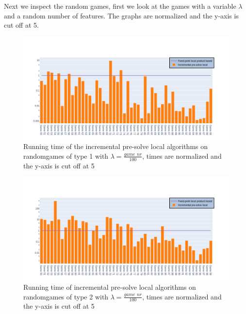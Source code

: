 Next we inspect the random games, first we look at the games with a variable $\lambda$ and a random number of features. The graphs are normalized and the y-axis is cut off at 5.
\begin{figure}[H]
	\includegraphics[width=1\linewidth]{"results/FF_randomgames/Fixed-point local product based_Incremental pre-solve local_"}
	\caption{Running time of the incremental pre-solve local algorithms on randomgames of type 1 with $\lambda = \frac{\textit{game nr}}{100}$, times are normalized and the y-axis is cut off at 5}
	\label{fig:elevatorzlnks}
\end{figure}%
\begin{figure}[H]
	\includegraphics[width=1\linewidth]{"results/FC_randomgames/Fixed-point local product based_Incremental pre-solve local_"}
	\caption{Running time of incremental pre-solve local algorithms on randomgames of type 2 with $\lambda = \frac{\textit{game nr}}{100}$, times are normalized and the y-axis is cut off at 5}
	\label{fig:elevatorzlnks}
\end{figure}%
